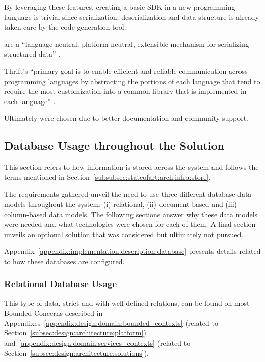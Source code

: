 By leveraging these features, creating a basic \gls{SDK} in a new programming language is trivial since serialization, deserialization and data structure is already taken care by the code generation tool.

 are a ``language-neutral, platform-neutral, extensible mechanism for serializing structured data'' \parencite{proto}.

Thrift's ``primary goal is to enable efficient and reliable communication across programming languages by abstracting the portions of each language that tend to require the most customization into a common library that is implemented in each language'' \parencite{thrift}.

Ultimately  were chosen due to better documentation and community support.

\subsection{Database Usage throughout the Solution}
\label{subsec:implementation:decisions:database}

This section refers to how information is stored across the system and follows the terms mentioned in Section~\ref{subsubsec:stateofart:arch:infra:store}.

The requirements gathered unveil the need to use three different database data models throughout the system: (i) relational, (ii) document-based and (iii) column-based data models. The following sections answer why these data models were needed and what technologies were chosen for each of them. A final section unveils an optional solution that was considered but ultimately not pursued.

Appendix~\ref{appendix:implementation:description:database} presents details related to how these databases are configured.

\subsubsection{Relational Database Usage}
\label{subsubsec:implementation:decisions:database:relational}

This type of data, strict and with well-defined relations, can be found on most Bounded Concerns described in Appendixes~\ref{appendix:design:domain:bounded_contexts} (related to Section~\ref{subsec:design:architecture:platform}) and~\ref{appendix:design:domain:services_contexts} (related to Section~\ref{subsec:design:architecture:solutions}).

